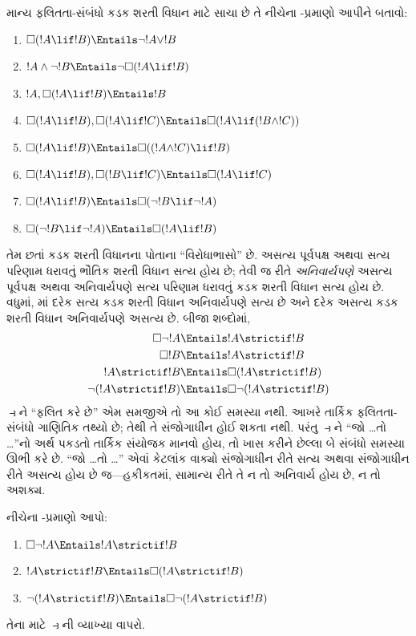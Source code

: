 \begin{prob}
  માન્ય ફલિતતા-સંબંધો કડક શરતી વિધાન માટે સાચા છે તે નીચેના
  -પ્રમાણો આપીને બતાવો:
  \begin{enumerate}
  \item  $\Box(!A \lif !B) \Entails \lnot !A \lor !B$
  \item $!A \land \lnot !B \Entails \lnot\Box(!A \lif !B)$
  \item $!A, \Box(!A \lif !B) \Entails !B$
  \item $\Box(!A \lif !B), \Box(!A \lif !C) \Entails \Box(!A \lif (!B
    \land !C))$
  \item $\Box(!A \lif !B) \Entails \Box((!A \land !C) \lif !B)$
  \item $\Box(!A \lif !B), \Box(!B \lif !C) \Entails \Box(!A
    \lif !C)$
  \item $\Box(!A \lif !B) \Entails \Box(\lnot !B \lif \lnot !A)$
  \item $\Box(\lnot !B \lif \lnot !A) \Entails \Box(!A \lif !B)$
  \end{enumerate}
  \end{prob}

તેમ છતાં કડક શરતી વિધાનના પોતાના ``વિરોધાભાસો'' છે. અસત્ય પૂર્વપક્ષ
અથવા સત્ય પરિણામ ધરાવતું ભૌતિક શરતી વિધાન સત્ય હોય છે; તેવી જ રીતે
\emph{અનિવાર્યપણે} અસત્ય પૂર્વપક્ષ અથવા અનિવાર્યપણે સત્ય પરિણામ ધરાવતું
કડક શરતી વિધાન સત્ય હોય છે. વધુમાં, માં દરેક સત્ય કડક શરતી
વિધાન અનિવાર્યપણે સત્ય છે અને દરેક અસત્ય કડક શરતી વિધાન અનિવાર્યપણે
અસત્ય છે. બીજા શબ્દોમાં,
\begin{align}
  \Box \lnot !A & \Entails !A \strictif !B\\
  \Box !B & \Entails !A \strictif !B\\
  !A \strictif !B& \Entails \Box(!A \strictif !B)\\
  \lnot(!A \strictif !B) & \Entails \Box\lnot(!A \strictif !B)
\end{align}
$\strictif$ને ``ફલિત કરે છે'' એમ સમજીએ તો આ કોઈ સમસ્યા નથી.
આખરે તાર્કિક ફલિતતા-સંબંધો ગાણિતિક તથ્યો છે; તેથી તે સંજોગાધીન
હોઈ શકતા નથી. પરંતુ $\strictif$ને ``જો \dots તો \dots''નો અર્થ
પકડતો તાર્કિક સંયોજક માનવો હોય, તો ખાસ કરીને છેલ્લા બે સંબંધો
સમસ્યા ઊભી કરે છે. ``જો \dots તો \dots'' એવાં કેટલાંક વાક્યો
સંજોગાધીન રીતે સત્ય અથવા સંજોગાધીન રીતે અસત્ય હોય છે જ---હકીકતમાં,
સામાન્ય રીતે તે ન તો અનિવાર્ય હોય છે, ન તો અશક્ય.

\begin{prob}
  નીચેના -પ્રમાણો આપો:
  \begin{enumerate}
    \item  $\Box \lnot !A \Entails !A \strictif !B$
    \item $!A \strictif !B \Entails \Box(!A \strictif !B)$
    \item $\lnot(!A \strictif !B)  \Entails \Box\lnot(!A \strictif !B)$
  \end{enumerate}
  તેના માટે $\strictif$ની વ્યાખ્યા વાપરો.
\end{prob}
\endgroup


